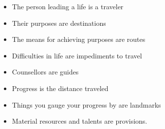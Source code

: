 \documentclass[a4paper,landscape,headrule,footrule,xetex]{foils}
\begin{document}


 



\begin{itemize}
\item The person leading a life is a traveler
\item Their purposes are destinations
\item The means for achieving purposes are routes
\item Difficulties in life are impediments to travel
\item Counsellors are guides
\item Progress is the distance traveled
\item Things you gauge your progress by are landmarks
\item Material resources and talents are provisions.
\end{itemize}
\end{document}
